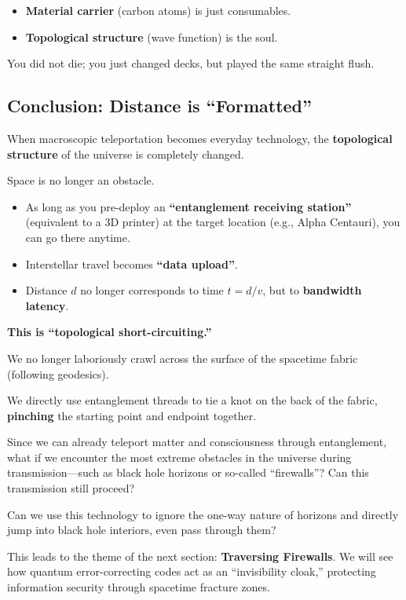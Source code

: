 \begin{itemize}
\item \textbf{Material carrier} (carbon atoms) is just consumables.

\item \textbf{Topological structure} (wave function) is the soul.
\end{itemize}

You did not die; you just changed decks, but played the same straight flush.

\subsection{Conclusion: Distance is ``Formatted''}

When macroscopic teleportation becomes everyday technology, the \textbf{topological structure} of the universe is completely changed.

Space is no longer an obstacle.

\begin{itemize}
\item As long as you pre-deploy an \textbf{``entanglement receiving station''} (equivalent to a 3D printer) at the target location (e.g., Alpha Centauri), you can go there anytime.

\item Interstellar travel becomes \textbf{``data upload''}.

\item Distance $d$ no longer corresponds to time $t = d/v$, but to \textbf{bandwidth latency}.
\end{itemize}

\textbf{This is ``topological short-circuiting.''}

We no longer laboriously crawl across the surface of the spacetime fabric (following geodesics).

We directly use entanglement threads to tie a knot on the back of the fabric, \textbf{pinching} the starting point and endpoint together.

Since we can already teleport matter and consciousness through entanglement, what if we encounter the most extreme obstacles in the universe during transmission---such as black hole horizons or so-called ``firewalls''? Can this transmission still proceed?

Can we use this technology to ignore the one-way nature of horizons and directly jump into black hole interiors, even pass through them?

This leads to the theme of the next section: \textbf{Traversing Firewalls}. We will see how quantum error-correcting codes act as an ``invisibility cloak,'' protecting information security through spacetime fracture zones.

